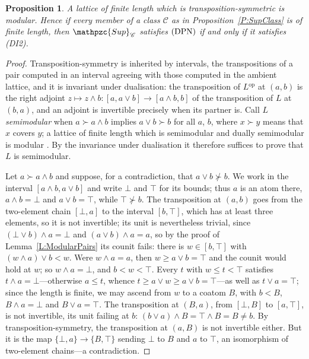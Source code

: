 \documentclass[reqno,a4paper]{amsart}
\numberwithin{equation}{section}
\theoremstyle{plain}
\newtheorem{proposition}[subsection]{Proposition}
\theoremstyle{definition}
\def\nameit#1{\textrm{#1}~}
\def\prox{\nameit{Proposition}}
\def\lemx{\nameit{Lemma}}
\def\dfn#1{{\itshape #1}}
\newcommand{\catfont}[1]{\ensuremath{\mathpzc{#1}}\xspace}
\newcommand{\Sup}{\catfont{Sup}}
\renewcommand{\1}{\onecat{1}}
\newcommand{\DPN}{\textup{(DPN)}}
\newcommand{\op}{\ensuremath{^{\operatorname{op}}}}
\begin{document}
\begin{proposition}\label{P:FiniteLength}
	A lattice of finite length which is transposition-symmetric is modular. Hence if every member of a class \(\mathcal{C}\) as in \prox\ref{P:SupClass} is of finite length, then \(\Sup_{\mathcal{C}}\) satisfies \(\DPN\) if and only if it satisfies \textup{(DI2)}.
\end{proposition}
\begin{proof}
	Transposition-symmetry is inherited by intervals, the transpositions of a pair computed in an interval agreeing with those computed in the ambient lattice, and it is invariant under dualisation: the transposition of \(L\op\) at \((a,b)\) is the right adjoint \(z\mapsto z\wedge b\colon[a,a\vee b]\to[a\wedge b,b]\) of the transposition of \(L\) at \((b,a)\), and an adjoint is invertible precisely when its partner is. Call \(L\) \dfn{semimodular} when \(a\succ a\wedge b\) implies \(a\vee b\succ b\) for all \(a\), \(b\), where \(x\succ y\) means that \(x\) covers \(y\); a lattice of finite length which is semimodular and dually semimodular is modular \cite[Chapter~II, Theorem~16]{Birkhoff}. By the invariance under dualisation it therefore suffices to prove that \(L\) is semimodular.

	Let \(a\succ a\wedge b\) and suppose, for a contradiction, that \(a\vee b\not\succ b\). We work in the interval \([a\wedge b,a\vee b]\) and write \(\bot\) and \(\top\) for its bounds; thus \(a\) is an atom there, \(a\wedge b=\bot\) and \(a\vee b=\top\), while \(\top\not\succ b\). The transposition at \((a,b)\) goes from the two-element chain \([\bot,a]\) to the interval \([b,\top]\), which has at least three elements, so it is not invertible; its unit is nevertheless trivial, since \((\bot\vee b)\wedge a=\bot\) and \((a\vee b)\wedge a=a\), so by the proof of \lemx\ref{L:ModularPairs} its counit fails: there is \(w\in[b,\top]\) with \((w\wedge a)\vee b<w\). Were \(w\wedge a=a\), then \(w\geq a\vee b=\top\) and the counit would hold at \(w\); so \(w\wedge a=\bot\), and \(b<w<\top\). Every \(t\) with \(w\leq t<\top\) satisfies \(t\wedge a=\bot\)---otherwise \(a\leq t\), whence \(t\geq a\vee w\geq a\vee b=\top\)---as well as \(t\vee a=\top\); since the length is finite, we may ascend from \(w\) to a coatom \(B\), with \(b<B\), \(B\wedge a=\bot\) and \(B\vee a=\top\). The transposition at \((B,a)\), from \([\bot,B]\) to \([a,\top]\), is not invertible, its unit failing at \(b\): \((b\vee a)\wedge B=\top\wedge B=B\neq b\). By transposition-symmetry, the transposition at \((a,B)\) is not invertible either. But it is the map \(\{\bot,a\}\to\{B,\top\}\) sending \(\bot\) to \(B\) and \(a\) to \(\top\), an isomorphism of two-element chains---a contradiction.
\end{proof}
\end{document}
